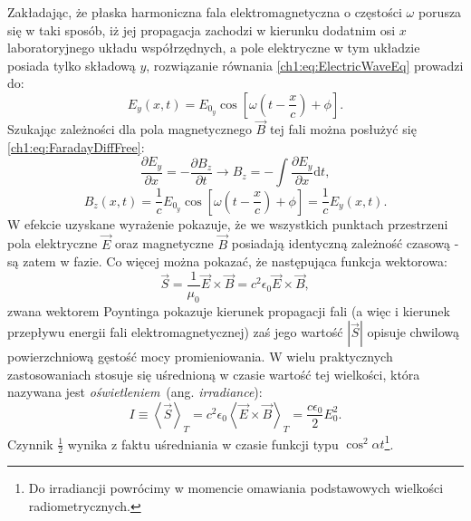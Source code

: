 Zakładając, że płaska harmoniczna fala elektromagnetyczna o częstości $\omega$ porusza się w taki sposób, iż jej propagacja zachodzi w kierunku dodatnim osi $x$ laboratoryjnego układu współrzędnych, a pole elektryczne w tym układzie posiada tylko składową $y$, rozwiązanie równania \eqref{ch1:eq:ElectricWaveEq} prowadzi do:
\begin{equation}
E_y(x,t)=E_{0_y}\cos\left[\omega\left(t - \frac{x}{c} \right) + \phi \right].
\label{ch1:eq:EyRealRefraction}
\end{equation}
Szukając zależności dla pola magnetycznego $\vec{B}$ tej fali można posłużyć się \eqref{ch1:eq:FaradayDiffFree}:
\begin{equation}
\frac{\partial E_y}{\partial x} = -\frac{\partial B_z}{\partial t} \rightarrow B_z = -\int\frac{\partial E_y}{\partial x}\mathrm{d}t,
\end{equation}
\begin{equation}
B_z(x,t)=\frac{1}{c}E_{0_y}\cos\left[\omega\left(t - \frac{x}{c} \right) + \phi \right]=\frac{1}{c}E_y(x,t).
\label{ch1:eq:EBRelationship}
\end{equation}
W efekcie uzyskane wyrażenie pokazuje, że we wszystkich punktach przestrzeni pola elektryczne $\vec{E}$ oraz magnetyczne $\vec{B}$ posiadają identyczną zależność czasową - są zatem w fazie. Co więcej można pokazać, że następująca funkcja wektorowa:
\begin{equation}
\vec{S} = \frac{1}{\mu_0}\vec{E}\times\vec{B} = c^2\epsilon_0\vec{E}\times\vec{B},
\label{ch1:eq:PoyntingVector}
\end{equation}
zwana wektorem Poyntinga pokazuje kierunek propagacji fali (a więc i kierunek przepływu energii fali elektromagnetycznej) zaś jego wartość $|\vec{S}|$ opisuje chwilową powierzchniową gęstość mocy promieniowania. W wielu praktycznych zastosowaniach stosuje się uśrednioną w czasie wartość tej wielkości, która nazywana jest \textit{oświetleniem}~(ang. \textit{irradiance}):
\begin{equation}
I\equiv\left\langle \vec{S} \right\rangle_T = c^2\epsilon_0\left\langle \vec{E}\times\vec{B} \right\rangle_T = \frac{c\epsilon_0}{2}E_{0}^2.
\label{ch1:eq:Irradiance}
\end{equation}
Czynnik $\frac{1}{2}$ wynika z faktu uśredniania w czasie funkcji typu $\cos^2\alpha t$\footnote{Do irradiancji powrócimy w momencie omawiania podstawowych wielkości radiometrycznych.}.

